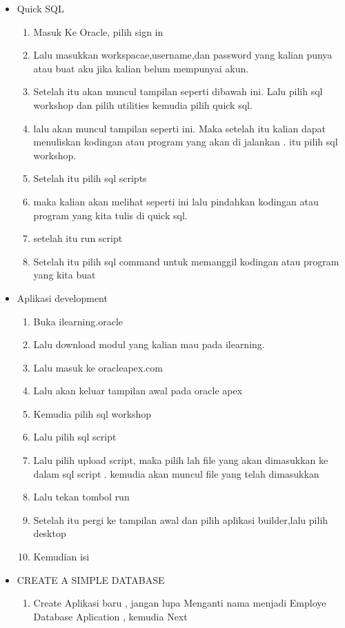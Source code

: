 \documentclass{article}
\begin{document}
\begin{itemize}
    \item Quick SQL
\begin{enumerate}
    \item Masuk Ke Oracle, pilih sign in
    \item Lalu masukkan workspacae,username,dan password yang kalian punya atau buat aku jika kalian belum mempunyai akun.
    \item Setelah itu akan muncul tampilan seperti dibawah ini. Lalu pilih sql workshop dan pilih utilities kemudia pilih quick sql.
    \item lalu akan muncul tampilan seperti ini.  Maka setelah itu kalian dapat menuliskan kodingan atau program yang akan di jalankan .
    \itemSetelah itu pilih sql workshop.
    \item Setelah itu pilih sql scripts
    \item maka kalian akan melihat seperti ini lalu pindahkan kodingan atau program yang kita tulis di quick sql.
    \item setelah itu run script
    \item Setelah itu pilih sql command untuk memanggil kodingan atau program yang kita buat
\end{enumerate}
\item Aplikasi development
\begin{enumerate}
    \item Buka ilearning.oracle
    \item Lalu download modul yang kalian mau pada ilearning.
    \item Lalu masuk ke oracleapex.com
    \item Lalu akan keluar tampilan awal pada oracle apex
    \item Kemudia pilih sql workshop
    \item Lalu pilih sql script
    \item Lalu pilih upload script, maka pilih lah file yang akan dimasukkan ke dalam sql script . kemudia akan muncul file yang telah dimasukkan
    \item Lalu tekan tombol run
    \item Setelah itu pergi ke tampilan awal dan pilih aplikasi builder,lalu pilih desktop
    \item Kemudian  isi
\end{enumerate}
\item CREATE A SIMPLE DATABASE
\begin{enumerate}
    \item Create Aplikasi baru , jangan lupa Menganti nama menjadi Employe Database Aplication , kemudia Next

\end{enumerate}
\end{itemize}
\end{document}
